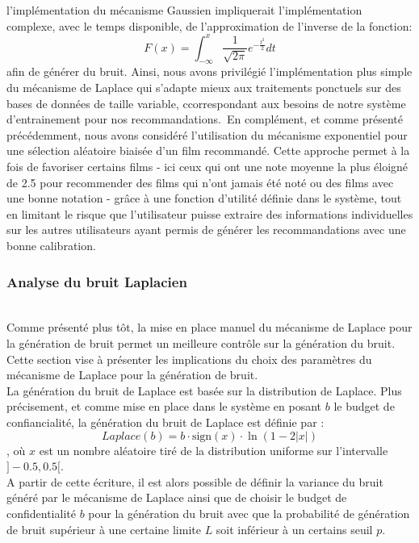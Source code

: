 \documentclass{article}
\begin{document}
l'implémentation du mécanisme Gaussien impliquerait l'implémentation complexe, avec le temps disponible, de l'approximation de l'inverse de la fonction:
\begin{equation}
    F(x) = \int_{-\infty}^{x} \frac{1}{\sqrt{2\pi}} e^{-\frac{t^2}{2}} dt
\end{equation}
afin de générer du bruit. Ainsi, nous avons privilégié l'implémentation plus simple du mécanisme de Laplace qui s’adapte mieux aux traitements 
ponctuels sur des bases de données de taille variable, ccorrespondant aux besoins de notre système d'entrainement pour nos recommandations.\
En complément, et comme présenté précédemment, nous avons considéré l'utilisation du mécanisme exponentiel pour une sélection aléatoire biaisée d'un film recommandé.
Cette approche permet à la fois de favoriser certains films - ici ceux qui ont une note moyenne la plus éloigné de 2.5 pour recommender des films qui n'ont jamais été noté ou des
films avec une bonne notation - grâce à une fonction d'utilité définie dans le système, tout en limitant le risque que 
l'utilisateur puisse extraire des informations individuelles sur les autres utilisateurs ayant permis de générer les recommandations avec une bonne 
calibration.

\subsubsection{Analyse du bruit Laplacien}
$ $\\
Comme présenté plus tôt, la mise en place manuel du mécanisme de Laplace pour la génération de bruit permet un meilleure contrôle sur la génération du bruit. Cette section vise à présenter 
les implications du choix des paramètres du mécanisme de Laplace pour la génération de bruit.\\
La génération du bruit de Laplace est basée sur la distribution de Laplace. Plus précisement, et comme mise en place dans le système en posant $b$ le budget de confiancialité, la génération du bruit de Laplace est définie par :
\begin{equation}
    Laplace(b) = b \cdot \text{sign}(x) \cdot \ln(1 - 2|x|)
    \label{eq:laplace}
\end{equation}
, où $x$ est un nombre aléatoire tiré de la distribution uniforme sur l'intervalle \( ]-0.5, 0.5[ \).\\
A partir de cette écriture, il est alors possible de définir la variance du bruit généré par le mécanisme de Laplace ainsi que de choisir le budget de confidentialité $b$ pour la génération du bruit avec que la 
probabilité de génération de bruit supérieur à une certaine limite $L$ soit inférieur à un certains seuil $p$.\\
\end{document}
